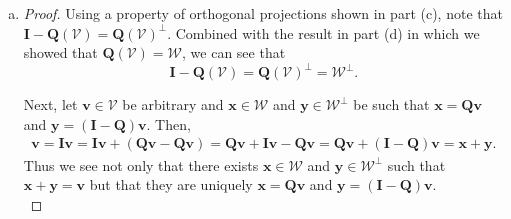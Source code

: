 \documentclass[12pt]{amsart}
\newcommand{\1}{\mathbbm{1}}
\numberwithin{equation}{section}
\numberwithin{Theorem}{section}
\theoremstyle{plain} %
\theoremstyle{definition}
\theoremstyle{remark}
\begin{document}
\begin{enumerate}[1.]
\begin{enumerate}[(a)]
	\item
	\begin{proof}
		Using a property of orthogonal projections shown in part (c), note that
		\(\mathbf{I}-\mathbf{Q}(\mathcal{V}) = \mathbf{Q}(\mathcal{V})^\perp\).
		Combined with the result in part (d) in which we showed that 
		\(\mathbf{Q}(\mathcal{V})=\mathcal{W}\),
		we can see that
		\[\mathbf{I}-\mathbf{Q}(\mathcal{V}) = \mathbf{Q}(\mathcal{V})^\perp = \mathcal{W}^\perp.\]
		
		Next, let
		\(\mathbf{v}\in\mathcal{V}\) be arbitrary
		and 
		\(\mathbf{x}\in\mathcal{W}\) and
		\(\mathbf{y}\in\mathcal{W}^\perp\) 
		be such that
		\(\mathbf{x}=\mathbf{Q}\mathbf{v}\) and
		\(\mathbf{y}=(\mathbf{I}-\mathbf{Q})\mathbf{v}\).
		Then,
		\begin{align*}
			\mathbf{v}
			= \mathbf{I}\mathbf{v}
			= \mathbf{I}\mathbf{v} + (\mathbf{Q}\mathbf{v}-\mathbf{Q}\mathbf{v})
			= \mathbf{Q}\mathbf{v} + \mathbf{I}\mathbf{v}-\mathbf{Q}\mathbf{v}
			= \mathbf{Q}\mathbf{v} + (\mathbf{I}-\mathbf{Q})\mathbf{v}
			= \mathbf{x} + \mathbf{y}.
		\end{align*}
		Thus we see not only that there exists 
		\(\mathbf{x}\in\mathcal{W}\) and
		\(\mathbf{y}\in\mathcal{W}^\perp\) 
		such that
		\(\mathbf{x} + \mathbf{y} = \mathbf{v}\)
		but that they are uniquely
		\(\mathbf{x}=\mathbf{Q}\mathbf{v}\) and
		\(\mathbf{y}=(\mathbf{I}-\mathbf{Q})\mathbf{v}\). \\
	\end{proof}


\end{enumerate}
\end{enumerate}
\end{document}
